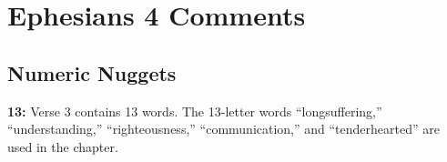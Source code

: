 \section{Ephesians 4 Comments}

\subsection{Numeric Nuggets}
\textbf{13:} Verse 3 contains 13 words. The 13-letter words ``longsuffering,'' ``understanding,'' ``righteousness,'' ``communication,'' and ``tenderhearted'' are used in the chapter.